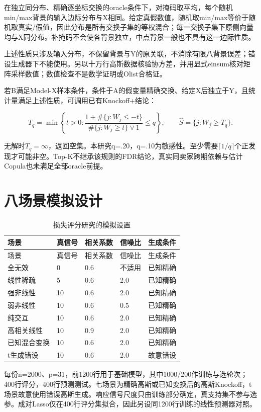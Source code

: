 \documentclass{sufethesismas}
\begin{document}
在独立同分布、精确逐坐标交换的oracle条件下，对掩码取平均，每个随机min/max背景的输入边际分布与X相同。给定真假数值，随机取min/max等价于随机取真实/假值，因此分布是所有交换子集的等权混合；每一交换子集下原侧向量均与X同分布。补掩码不会使各背景独立，中点背景一般也不具有这一边际性质。

上述性质只涉及输入分布，不保留背景与Y的原关联，不消除有限八背景误差；错设生成器下不能使用。另以十万行高斯数据核验协方差，并用显式einsum核对矩阵采样数值；数值检查不是数学证明或Olist合格证。

若B满足Model-X样本条件，条件于A的假变量精确交换、给定X后独立于Y，且统计量满足上述性质，可调用已有Knockoff+结论：

\[
T_q=\min\left\{t>0:
\frac{1+\#\{j:W_j\le -t\}}{\#\{j:W_j\ge t\}\vee1}\le q\right\},
\qquad \widehat S=\{j:W_j\ge T_q\}.
\]

无解时\(T_q=\infty\)，返回空集。本研究q=.20，q=.10为敏感性。至少需要\(\lceil1/q\rceil\)个正发现才可能非空。Top-K不继承该规则的FDR结论，真实同卖家跨期依赖与估计Copula也未满足全部oracle前提。

\section{八场景模拟设计}

{
\footnotesize
\begin{longtable}[]{@{}lllll@{}}
\caption{损失评分研究的模拟设置}\tabularnewline
\toprule\noalign{}
场景 & 真信号 & 相关系数 & 信噪比 & 生成条件 \\
\midrule\noalign{}
\endfirsthead
\toprule\noalign{}
场景 & 真信号 & 相关系数 & 信噪比 & 生成条件 \\
\midrule\noalign{}
\endhead
\bottomrule\noalign{}
\endlastfoot
全无效 & 0 & 0.6 & 不适用 & 已知精确 \\
线性稀疏 & 5 & 0.6 & 2.0 & 已知精确 \\
强非线性 & 10 & 0.6 & 2.0 & 已知精确 \\
弱非线性 & 10 & 0.6 & 0.5 & 已知精确 \\
纯交互 & 10 & 0.6 & 2.0 & 已知精确 \\
高相关线性 & 10 & 0.9 & 2.0 & 已知精确 \\
已知混合变换 & 10 & 0.6 & 2.0 & 已知精确 \\
t生成错设 & 10 & 0.6 & 2.0 & 故意错设 \\
\end{longtable}
}

每份n=2000、p=31，前1200行用于基础模型，其中1000/200作训练与选轮次；400行评分，400行预测测试。七场景为精确高斯或已知变换后的高斯Knockoff，t场景故意使用错误高斯生成。响应信号尺度只由训练部分确定，真支持集不参与选参。成对Lasso仅在400行评分集拟合，因此另设同1200行训练的线性预测器对照。
\end{document}
